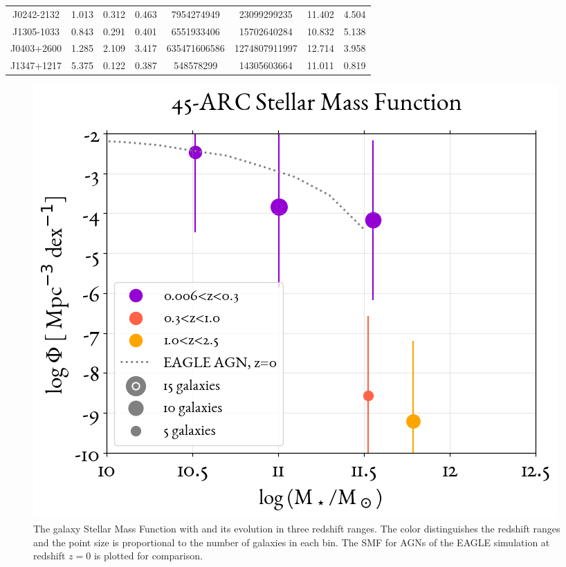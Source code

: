 \begin{xltabular}{\textwidth}{cccccccc}
    J0242-2132 & 1.013 & 0.312 & 0.463  & 7954274949 & 23099299235  & 11.402 & 4.504  \\*
    J1305-1033 & 0.843 & 0.291 & 0.401  & 6551933406 & 15702640284  & 10.832 & 5.138  \\*
    J0403+2600 & 1.285 & 2.109 & 3.417  & 635471606586 & 1274807911997  & 12.714 & 3.958  \\*
    J1347+1217 & 5.375 & 0.122 & 0.387  & 548578299 & 14305603664  & 11.011 & 0.819  \\*
\end{xltabular}



\begin{figure}
    \centering
    \includegraphics[width=\linewidth]{figures/ResultPlots/SMF_compl_werr.png}
    \caption{The galaxy Stellar Mass Function with and its evolution in three redshift ranges. The color distinguishes the redshift ranges and the point size is proportional to the number of galaxies in each bin. The SMF for AGNs of the EAGLE\cite{EAGLE} simulation at redshift $z=0$ is plotted for comparison.}
    \label{fig:ARC_SMF}
\end{figure}






